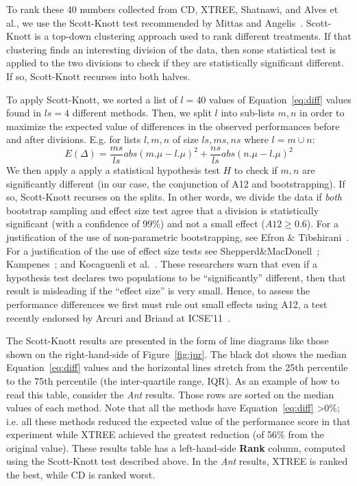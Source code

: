 \documentclass[twocolumn,5p]{elsarticle}
\newcommand{\fig}[1]{Figure~\ref{fig:#1}}
\newcommand{\eq}[1]{Equation~\ref{eq:#1}}
\theoremstyle{break}
\begin{document}
\begin{itemize}
		
		
		
		
		To rank these 40 numbers collected from CD, XTREE, Shatnawi, and Alves et al., we use the Scott-Knott test recommended by Mittas and Angelis~\cite{mittas13}. 
		Scott-Knott is a top-down clustering approach used to rank different
		treatments. If that clustering finds an interesting division of the data, then
		some statistical test is applied to the two divisions to check if they
		are statistically significant different. If so, Scott-Knott recurses
		into both halves.
		
		To  apply Scott-Knott,
		we
		sorted a list of  $l=40$ values of \eq{diff} values found in  $ls=4$ different methods. 
		Then, we split $l$ into sub-lists $m,n$ in order to maximize the expected value of differences in the observed performances before and after divisions. E.g. for lists $l,m,n$ of size $ls,ms,ns$ where $l=m\cup n$: \[E(\Delta)=\frac{ms}{ls}abs(m.\mu - l.\mu)^2 + \frac{ns}{ls}abs(n.\mu - l.\mu)^2\]
		We then apply a apply a statistical hypothesis test $H$ to check
		if $m,n$ are significantly different  (in our case, the conjunction of A12 and bootstrapping). If so, Scott-Knott recurses on the splits. In other words, we divide the data if \textit{both} bootstrap sampling and effect size test agree that a division is statistically significant (with a confidence of 99\%) and not a small effect ($A12 \ge 0.6$).
		For a justification of the use of non-parametric bootstrapping, see Efron \& Tibshirani~\cite[p220-223]{efron93}. For a justification of the use of effect size tests see Shepperd\&MacDonell~\cite{shepperd12a}; Kampenes~\cite{kampenes07}; and Kocaguenli et al.~\cite{Kocaguneli2013:ep}. These researchers warn that even if a hypothesis test declares two populations to be ``significantly'' different, then that result is misleading if the ``effect size'' is very small. Hence, to assess the performance differences we first must rule out small effects using A12, a test   recently endorsed by Arcuri and Briand at ICSE'11~\cite{arcuri11}.
		
		The Scott-Knott  results are presented in the form of line diagrams like those shown on the right-hand-side of \fig{jur}.
		The black dot shows the median \eq{diff} values and the horizontal lines stretch 
		from the 25th percentile to the 75th percentile (the inter-quartile range, IQR).
		As an example of how to read this table, consider the {\em Ant}
		results. Those rows are  sorted on the median values of each method. Note that all the methods have \eq{diff} \textgreater $ 0\%$; i.e. all these methods reduced the expected value of the performance score in that experiment while XTREE achieved the greatest reduction (of 56\% from the original value).
		These results table has a  left-hand-side  {\bf Rank} column, computed using the
		Scott-Knott test described above. In the {\em Ant}
		results, XTREE is ranked the best, while CD is  ranked   worst.
		

\end{itemize}
\end{document}
